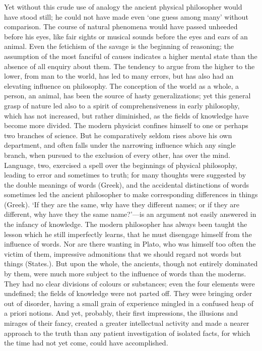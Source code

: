 \documentclass[11pt,letter]{article}
\begin{document}
\par  Yet without this crude use of analogy the ancient physical philosopher would have stood still; he could not have made even ‘one guess among many’ without comparison. The course of natural phenomena would have passed unheeded before his eyes, like fair sights or musical sounds before the eyes and ears of an animal. Even the fetichism of the savage is the beginning of reasoning; the assumption of the most fanciful of causes indicates a higher mental state than the absence of all enquiry about them. The tendency to argue from the higher to the lower, from man to the world, has led to many errors, but has also had an elevating influence on philosophy. The conception of the world as a whole, a person, an animal, has been the source of hasty generalizations; yet this general grasp of nature led also to a spirit of comprehensiveness in early philosophy, which has not increased, but rather diminished, as the fields of knowledge have become more divided. The modern physicist confines himself to one or perhaps two branches of science. But he comparatively seldom rises above his own department, and often falls under the narrowing influence which any single branch, when pursued to the exclusion of every other, has over the mind. Language, two, exercised a spell over the beginnings of physical philosophy, leading to error and sometimes to truth; for many thoughts were suggested by the double meanings of words (Greek), and the accidental distinctions of words sometimes led the ancient philosopher to make corresponding differences in things (Greek). ‘If they are the same, why have they different names; or if they are different, why have they the same name?’—is an argument not easily answered in the infancy of knowledge. The modern philosopher has always been taught the lesson which he still imperfectly learns, that he must disengage himself from the influence of words. Nor are there wanting in Plato, who was himself too often the victim of them, impressive admonitions that we should regard not words but things (States.). But upon the whole, the ancients, though not entirely dominated by them, were much more subject to the influence of words than the moderns. They had no clear divisions of colours or substances; even the four elements were undefined; the fields of knowledge were not parted off. They were bringing order out of disorder, having a small grain of experience mingled in a confused heap of a priori notions. And yet, probably, their first impressions, the illusions and mirages of their fancy, created a greater intellectual activity and made a nearer approach to the truth than any patient investigation of isolated facts, for which the time had not yet come, could have accomplished.
\end{document}
